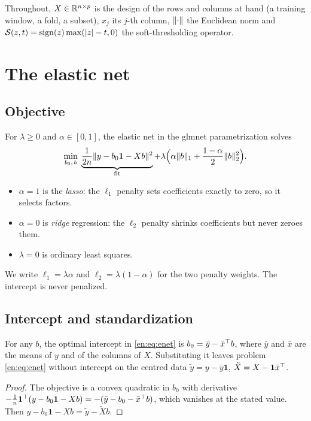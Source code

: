 Throughout, $X\in\mathbb{R}^{n\times p}$ is the design of the rows and columns at hand (a training
window, a fold, a subset), $x_j$ its $j$-th column, $\lVert \cdot\rVert$ the Euclidean norm and
$\mathcal{S}(z,t)=\operatorname{sign}(z)\max(|z|-t,0)$ the soft-thresholding operator.

\section{The elastic net}

\subsection{Objective}
For $\lambda\ge0$ and $\alpha\in[0,1]$, the elastic net in the glmnet parametrization
solves
\begin{equation}\label{en:eq:enet}
  \min_{b_0,\,b}\;
  \underbrace{\frac{1}{2n}\lVert y-b_0\mathbf 1-Xb\rVert^2}_{\text{fit}}
  +\lambda\Big(\alpha\lVert b\rVert_1+\frac{1-\alpha}{2}\lVert b\rVert_2^2\Big).
\end{equation}
\begin{itemize}
  \item $\alpha=1$ is the \emph{lasso}: the $\ell_1$ penalty sets coefficients exactly to
        zero, so it selects factors.
  \item $\alpha=0$ is \emph{ridge} regression: the $\ell_2$ penalty shrinks coefficients
        but never zeroes them.
  \item $\lambda=0$ is ordinary least squares.
\end{itemize}
We write $\ell_1=\lambda\alpha$ and $\ell_2=\lambda(1-\alpha)$ for the two penalty weights.
The intercept is never penalized.

\subsection{Intercept and standardization}\label{en:sec:standardize}

\begin{proposition}[Intercept]\label{en:prop:intercept}
For any $b$, the optimal intercept in \eqref{en:eq:enet} is $b_0=\bar y-\bar x^\top b$, where
$\bar y$ and $\bar x$ are the means of $y$ and of the columns of $X$. Substituting it
leaves problem \eqref{en:eq:enet} without intercept on the centred data
$\tilde y=y-\bar y\mathbf 1$, $\tilde X=X-\mathbf 1\bar x^\top$.
\end{proposition}
\begin{proof}
The objective is a convex quadratic in $b_0$ with derivative
$-\frac1n\mathbf 1^\top(y-b_0\mathbf 1-Xb)=-(\bar y-b_0-\bar x^\top b)$, which vanishes at the stated
value. Then $y-b_0\mathbf 1-Xb=\tilde y-\tilde Xb$.
\end{proof}

